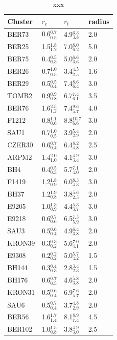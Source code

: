 \documentclass{aa}
\begin{document}
  \begin{table}
  \caption{xxx}
  \label{tab:radii}
  \centering
  \begin{tabular}{llll}
  \hline\hline
  Cluster & $r_{c}$  &  $r_{t}$ & radius\\
  \hline
   BER73         & 0.6$_{0.5}^{0.7}$ &  4.9$_{3.8}^{6.3}$ &  2.0\\
   BER25         & 1.5$_{1.2}^{1.8}$ &  7.0$_{6.2}^{8.0}$ &  5.0\\
   BER75         & 0.4$_{0.3}^{0.5}$ &  5.0$_{3.6}^{6.6}$ &  2.0\\
   BER26         & 0.7$_{0.5}^{1.0}$ &  3.4$_{2.5}^{4.5}$ &  1.6\\
   BER29         & 0.5$_{0.4}^{0.5}$ &  7.4$_{6.4}^{8.6}$ &  3.0\\
   TOMB2         & 0.9$_{0.8}^{0.9}$ &  6.7$_{6.1}^{7.4}$ &  3.5\\
   BER76         & 1.6$_{1.2}^{2.5}$ &  7.4$_{5.7}^{9.6}$ &  4.0\\
   F1212         & 0.8$_{0.6}^{1.1}$ &  8.8$_{6.6}^{10.7}$ & 3.0\\
   SAU1          & 0.7$_{0.5}^{1.0}$ &  3.9$_{2.9}^{5.4}$ &  2.0\\
   CZER30        & 0.6$_{0.4}^{0.7}$ &  6.4$_{4.8}^{8.2}$ &  2.5\\
   ARPM2         & 1.4$_{1.0}^{2.0}$ &  4.1$_{3.4}^{4.9}$ &  3.0\\
   BH4           & 0.4$_{0.3}^{0.5}$ &  5.7$_{4.0}^{7.1}$ &  2.0\\
   F1419         & 1.2$_{0.9}^{1.8}$ &  6.0$_{4.3}^{8.3}$ &  3.0\\
   BH37          & 1.2$_{0.8}^{1.9}$ &  3.8$_{2.5}^{5.6}$ &  2.0\\
   E9205         & 1.0$_{0.9}^{1.3}$ &  4.4$_{3.7}^{5.3}$ &  3.0\\
   E9218         & 0.6$_{0.6}^{0.7}$ &  6.5$_{5.9}^{7.3}$ &  3.0\\
   SAU3          & 0.5$_{0.4}^{0.6}$ &  4.9$_{3.8}^{6.4}$ &  2.0\\
   KRON39        & 0.3$_{0.2}^{0.3}$ &  5.6$_{4.1}^{7.0}$ &  2.0\\
   E9308         & 0.2$_{0.2}^{0.2}$ &  5.0$_{4.2}^{5.7}$ &  1.5\\
   BH144         & 0.3$_{0.3}^{0.4}$ &  2.8$_{2.3}^{3.4}$ &  1.5\\
   BH176         & 0.6$_{0.5}^{0.7}$ &  4.6$_{3.8}^{5.8}$ &  2.0\\
   KRON31        & 0.5$_{0.4}^{0.6}$ &  6.9$_{5.7}^{7.6}$ &  2.0\\
   SAU6          & 0.5$_{0.4}^{0.7}$ &  3.7$_{2.9}^{4.8}$ &  2.0\\
   BER56         & 1.6$_{1.4}^{1.7}$ &  8.1$_{7.4}^{8.9}$ &  4.5\\
   BER102        & 1.0$_{0.8}^{1.5}$ &  3.8$_{3.0}^{4.9}$ &  2.5\\
  \hline
  \end{tabular}
  \end{table}
\end{document}

